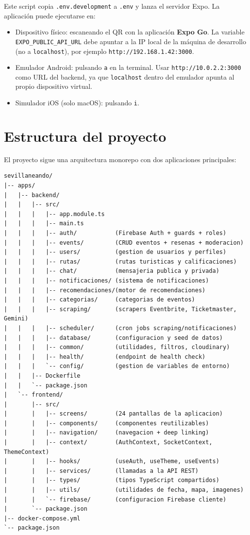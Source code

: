 Este script copia \texttt{.env.development} a \texttt{.env} y lanza el servidor Expo. La aplicación puede ejecutarse en:
\begin{itemize}
    \item Dispositivo físico: escaneando el QR con la aplicación \textbf{Expo Go}. La variable \texttt{EXPO\_PUBLIC\_API\_URL} debe apuntar a la IP local de la máquina de desarrollo (no a \texttt{localhost}), por ejemplo \texttt{http://192.168.1.42:3000}.
    \item Emulador Android: pulsando \texttt{a} en la terminal. Usar \texttt{http://10.0.2.2:3000} como URL del backend, ya que \texttt{localhost} dentro del emulador apunta al propio dispositivo virtual.
    \item Simulador iOS (solo macOS): pulsando \texttt{i}.
\end{itemize}

\section{Estructura del proyecto}

El proyecto sigue una arquitectura monorepo con dos aplicaciones principales:

\begin{verbatim}
sevillaneando/
|-- apps/
|   |-- backend/
|   |   |-- src/
|   |   |   |-- app.module.ts
|   |   |   |-- main.ts
|   |   |   |-- auth/           (Firebase Auth + guards + roles)
|   |   |   |-- events/         (CRUD eventos + resenas + moderacion)
|   |   |   |-- users/          (gestion de usuarios y perfiles)
|   |   |   |-- rutas/          (rutas turisticas y calificaciones)
|   |   |   |-- chat/           (mensajeria publica y privada)
|   |   |   |-- notificaciones/ (sistema de notificaciones)
|   |   |   |-- recomendaciones/(motor de recomendaciones)
|   |   |   |-- categorias/     (categorias de eventos)
|   |   |   |-- scraping/       (scrapers Eventbrite, Ticketmaster, Gemini)
|   |   |   |-- scheduler/      (cron jobs scraping/notificaciones)
|   |   |   |-- database/       (configuracion y seed de datos)
|   |   |   |-- common/         (utilidades, filtros, cloudinary)
|   |   |   |-- health/         (endpoint de health check)
|   |   |   `-- config/         (gestion de variables de entorno)
|   |   |-- Dockerfile
|   |   `-- package.json
|   `-- frontend/
|       |-- src/
|       |   |-- screens/        (24 pantallas de la aplicacion)
|       |   |-- components/     (componentes reutilizables)
|       |   |-- navigation/     (navegacion + deep linking)
|       |   |-- context/        (AuthContext, SocketContext, ThemeContext)
|       |   |-- hooks/          (useAuth, useTheme, useEvents)
|       |   |-- services/       (llamadas a la API REST)
|       |   |-- types/          (tipos TypeScript compartidos)
|       |   |-- utils/          (utilidades de fecha, mapa, imagenes)
|       |   `-- firebase/       (configuracion Firebase cliente)
|       `-- package.json
|-- docker-compose.yml
`-- package.json
\end{verbatim}

